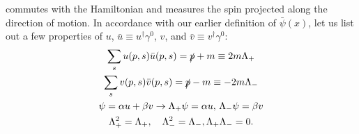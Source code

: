 \documentclass{article}
\begin{document}
commutes with the Hamiltonian and measures the spin projected along the direction of motion. In accordance with our earlier definition of $\bar{\psi}(x)$, let us list out a few properties of $u$, $\bar{u} \equiv u^\dagger \gamma^0$, $v$, and $\bar{v} \equiv v^\dagger \gamma^0$:
\begin{gather}
    \sum_s u(p, s) \bar{u} (p, s) = \slashed{p} + m \equiv 2m\Lambda_+ \\
    \sum_s v(p, s) \bar{v} (p, s) = \slashed{p} - m \equiv -2m \Lambda_- \\
    \psi = \alpha u + \beta v \rightarrow \Lambda_+ \psi = \alpha u, \, \Lambda_- \psi = \beta v \\
    \Lambda_+^2 = \Lambda_+, \quad \Lambda_-^2 = \Lambda_-, \Lambda_+ \Lambda_- = 0.
\end{gather}
\end{document}
